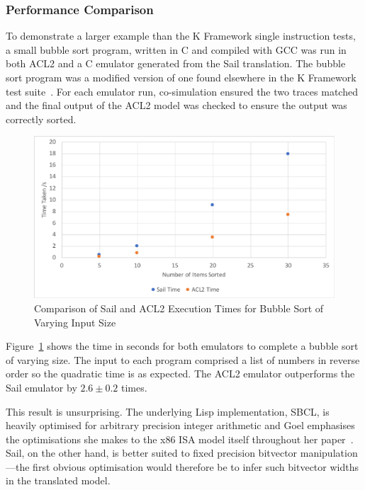 \documentclass[a4paper,12pt,twoside,openright]{report}
\begin{document}
\subsubsection{Performance Comparison}

To demonstrate a larger example than the K Framework single instruction tests, a small bubble sort program, written in C and compiled with GCC was run in both ACL2 and a C emulator generated from the Sail translation.  The bubble sort program was a modified version of one found elsewhere in the K Framework test suite~\cite{k-framework-bubble}.  For each emulator run, co-simulation ensured the two traces matched and the final output of the ACL2 model was checked to ensure the output was correctly sorted.

\begin{figure}
\centering

  \includegraphics[width=\columnwidth]{../diagrams/speed.pdf}

\caption{Comparison of Sail and ACL2 Execution Times for Bubble Sort of Varying Input Size}
\label{diagram-speed}
\end{figure}

Figure~\ref{diagram-speed} shows the time in seconds for both emulators to complete a bubble sort of varying size.  The input to each program comprised a list of numbers in reverse order so the quadratic time is as expected.  The ACL2 emulator outperforms the Sail emulator by $2.6 \pm 0.2$ times.

This result is unsurprising.  The underlying Lisp implementation, SBCL, is heavily optimised for arbitrary precision integer arithmetic and Goel emphasises the optimisations she makes to the x86 ISA model itself throughout her paper~\cite{goel-thesis}.  Sail, on the other hand, is better suited to fixed precision bitvector manipulation---the first obvious optimisation would therefore be to infer such bitvector widths in the translated model.
\end{document}
